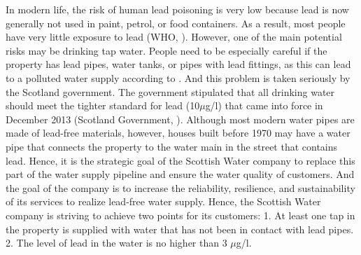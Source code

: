 \documentclass[11pt,twoside]{article}
\numberwithin{Theorem}{section}
\numberwithin{Definition}{section}
\numberwithin{Lemma}{section}
\numberwithin{Algorithm}{section}
\numberwithin{equation}{section}
\begin{document}
In modern life, the risk of human lead poisoning is very low because lead is now generally not used in paint, petrol, or food containers. As a result, most people have very little exposure to lead (WHO, \citeyear{who}). However, one of the main potential risks may be drinking tap water. People need to be especially careful if the property has lead pipes, water tanks, or pipes with lead fittings, as this can lead to a polluted water supply according to \cite{tee}. And this problem is taken seriously by the Scotland government. The government stipulated that all drinking water should meet the tighter standard for lead (10$\mu$g/l) that came into force in December 2013 (Scotland Government, \citeyear{government}). Although most modern water pipes are made of lead-free materials, however, houses built before 1970 may have a water pipe that connects the property to the water main in the street that contains lead. Hence, it is the strategic goal of the Scottish Water company to replace this part of the water supply pipeline and ensure the water quality of customers. And the goal of the company is to increase the reliability, resilience, and sustainability of its services to realize lead-free water supply. Hence, the Scottish Water company is striving to achieve two points for its customers: 1. At least one tap in the property is supplied with water that has not been in contact with lead pipes. 2. The level of lead in the water is no higher than 3 $\mu$g/l.

\clearpage
\end{document}
